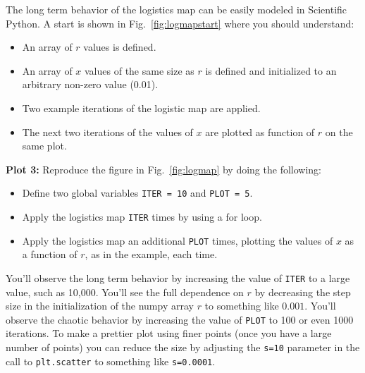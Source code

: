 The long term behavior of the logistics map can be easily modeled in Scientific Python.  A start is shown in Fig.~\ref{fig:logmapstart} where you should understand:
\begin{itemize}
\item An array of $r$ values is defined.
\item An array of $x$ values of the same size as $r$ is defined and initialized to an arbitrary non-zero value (0.01).
\item Two example iterations of the logistic map are applied.
\item The next two iterations of the values of $x$ are plotted as function of $r$ on the same plot.
\end{itemize}
{\bf Plot 3:}  Reproduce the figure in Fig.~\ref{fig:logmap} by doing the following:
\begin{itemize}
\item Define two global variables {\tt ITER = 10} and {\tt PLOT = 5}.
\item Apply the logistics map {\tt ITER} times by using a for loop.
\item Apply the logistics map an additional {\tt PLOT} times, plotting the values of $x$ as a function of $r$, as in the example, each time.
\end{itemize}
You'll observe the long term behavior by increasing the value of {\tt ITER} to a large value, such as 10,000.
You'll see the full dependence on $r$ by decreasing the step size in the initialization of the numpy array $r$ to something like $0.001$.  You'll observe the chaotic behavior by increasing the value of {\tt PLOT} to 100 or even 1000 iterations.  To make a prettier plot using finer points (once you have a large number of points) you can reduce the size by adjusting the {\tt s=10} parameter in the call to {\tt plt.scatter} to something like {\tt s=0.0001}.


